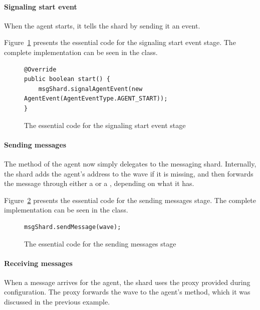\documentclass{article}
\begin{document}
\paragraph{Signaling start event} 

When the agent starts, it tells the shard by sending it an  event. 

Figure~\ref{fig:func:startAgentPingPong:code} presents the essential code for the signaling start event stage. The complete implementation can be seen in the  class.

\begin{figure}[ht]\centering
\begin{lstlisting}
@Override
public boolean start() {
    msgShard.signalAgentEvent(new AgentEvent(AgentEventType.AGENT_START));
}
\end{lstlisting}
\caption{The essential code for the signaling start event stage}\label{fig:func:startAgentPingPong:code}
\end{figure}

\paragraph{Sending messages} 

The  method of the agent now simply delegates to the messaging shard. Internally, the shard adds the agent’s address to the wave if it is missing, and then forwards the message through either a  or a , depending on what it has.

Figure~\ref{fig:func:sendAgentPingPong:code} presents the essential code for the sending messages stage. The complete implementation can be seen in the  class.

\begin{figure}[ht]\centering
\begin{lstlisting}
msgShard.sendMessage(wave);
\end{lstlisting}
\caption{The essential code for the sending messages stage}\label{fig:func:sendAgentPingPong:code}
\end{figure}

\paragraph{Receiving messages} 

When a message arrives for the agent, the shard uses the proxy provided during configuration. The proxy forwards the wave to the agent’s  method, which it was discussed in the previous example.
\end{document}
